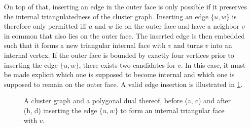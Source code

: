 On top of that, inserting an edge in the outer face is only possible if it preserves the internal triangulatedness of the cluster graph.
Inserting an edge $\{u,w\}$ is therefore only permitted iff $u$ and $w$ lie on the outer face and have a neighbor $v$ in common that also lies on the outer face.
The inserted edge is then embedded such that it forms a new triangular internal face with $v$ and turns $v$ into an internal vertex.
If the outer face is bounded by exactly four vertices prior to inserting the edge $\{u,w\}$, there exists two candidates for $v$.
In this case, it must be made explicit which one is supposed to become internal and which one is supposed to remain on the outer face.
A valid edge insertion is illustrated in \cref{fig:flip-edge-example-insert}.

\begin{figure}[H]
	\centering
	\quad
	\qquad
	\quad
	\caption{A cluster graph and a polygonal dual thereof, before (a, c) and after (b, d) inserting the edge $\{u,w\}$ to form an internal triangular face with $v$.}
	\label{fig:flip-edge-example-insert}
\end{figure}

